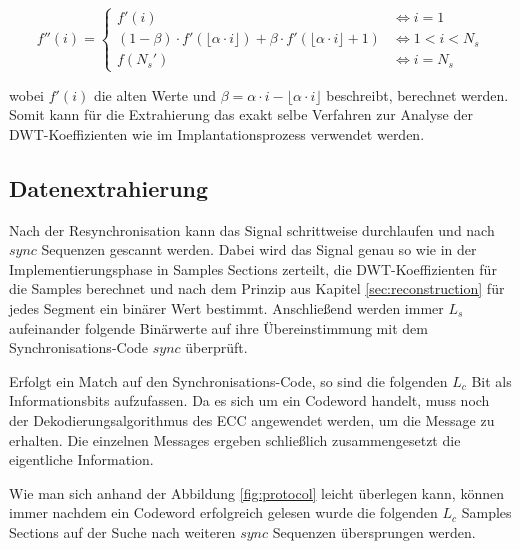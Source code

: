 	\begin{equation}
		f''(i) = \begin{cases}
    	 	f'(i) & \iff i = 1	
			\\
			(1-\beta) \cdot f'(\lfloor\alpha \cdot i\rfloor) + \beta \cdot f'(\lfloor\alpha \cdot i\rfloor + 1) & \iff 1 < i < {N}_{s} 
			\\
    		f({N}_{s}') & \iff i = {N}_{s}
  		 \end{cases}
		\label{equ:lagrange_interpolation}
	\end{equation}
	
wobei $f'(i)$ die alten Werte und $\beta = \alpha \cdot i - \lfloor \alpha \cdot i \rfloor$ beschreibt, berechnet werden. Somit kann für die Extrahierung das exakt selbe Verfahren zur Analyse der DWT-Koeffizienten wie im Implantationsprozess verwendet werden. 

\subsection{Datenextrahierung}

Nach der Resynchronisation kann das Signal schrittweise durchlaufen und nach $sync$ Sequenzen gescannt werden. Dabei wird das Signal genau so wie in der Implementierungsphase in Samples Sections zerteilt, die DWT-Koeffizienten für die Samples berechnet und nach dem Prinzip aus Kapitel \ref{sec:reconstruction} für jedes Segment ein binärer Wert bestimmt. Anschließend werden immer $L_s$ aufeinander folgende Binärwerte auf ihre Übereinstimmung mit dem Synchronisations-Code $sync$ überprüft.

Erfolgt ein Match auf den Synchronisations-Code, so sind die folgenden $L_c$ Bit als Informationsbits aufzufassen. Da es sich um ein Codeword handelt, muss noch der Dekodierungsalgorithmus des ECC angewendet werden, um die Message zu erhalten. Die einzelnen Messages ergeben schließlich zusammengesetzt die eigentliche Information. 

Wie man sich anhand der Abbildung \ref{fig:protocol} leicht überlegen kann, können immer nachdem ein Codeword erfolgreich gelesen wurde die folgenden $L_c$ Samples Sections  auf der Suche nach weiteren $sync$ Sequenzen übersprungen werden.




